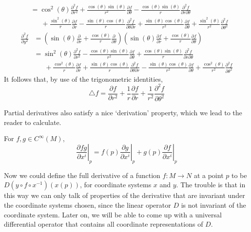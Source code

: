 \begin{example}
\begin{align*}
        &= \cos^2(\theta) \frac{\partial^2 f}{\partial r^2} + \frac{\cos(\theta) \sin(\theta)}{r^2} \frac{\partial f}{\partial \theta} - \frac{\cos(\theta) \sin(\theta)}{r} \frac{\partial^2 f}{\partial r \partial \theta}\\
        &\ \ \ \ \ \ \ + \frac{\sin^2(\theta)}{r} \frac{\partial f}{\partial r} - \frac{\sin(\theta) \cos(\theta)}{r} \frac{\partial^2 f}{\partial \theta \partial r} + \frac{\sin(\theta) \cos(\theta)}{r^2} \frac{\partial f}{\partial \theta} + \frac{\sin^2(\theta)}{r^2} \frac{\partial^2 f}{\partial \theta^2}
    \end{align*}
    \begin{align*}
        \frac{\partial^2 f}{\partial y^2} &= \left( \sin(\theta) \frac{\partial}{\partial r} + \frac{\cos(\theta)}{r} \frac{\partial}{\partial \theta} \right) \left( \sin(\theta) \frac{\partial f}{\partial r} + \frac{\cos(\theta)}{r} \frac{\partial f}{\partial \theta} \right)\\
        &= \sin^2(\theta) \frac{\partial^2 f}{\partial r^2} - \frac{\cos(\theta) \sin(\theta)}{r^2} \frac{\partial f}{\partial \theta} + \frac{\cos(\theta) \sin(\theta)}{r} \frac{\partial^2 f}{\partial r \partial \theta}\\
        &\ \ \ \ \ \ \ + \frac{\cos^2(\theta)}{r} \frac{\partial f}{\partial r} + \frac{\sin(\theta) \cos(\theta)}{r} \frac{\partial^2 f}{\partial \theta \partial r} - \frac{\sin(\theta) \cos(\theta)}{r^2} \frac{\partial f}{\partial \theta} + \frac{\cos^2(\theta)}{r^2} \frac{\partial^2 f}{\partial \theta^2}
    \end{align*}
    It follows that, by use of the trigonometric identities,
    \[ \bigtriangleup f = \frac{\partial f}{\partial r^2} + \frac{1}{r} \frac{\partial f}{\partial r} + \frac{1}{r^2} \frac{\partial^2 f}{\partial \theta^2} \]
\end{example}

Partial derivatives also satisfy a nice `derivation' property, which we lead to the reader to calculate.

\begin{lemma}
    For $f,g \in C^\infty(M)$,
    \[ \left.\frac{\partial fg}{\partial x^i}\right|_p = f(p)\left.\frac{\partial g}{\partial x^i}\right|_p + g(p)\left.\frac{\partial f}{\partial x^i}\right|_p  \]
\end{lemma}

Now we could define the full derivative of a function $f:M \to N$ at a point $p$ to be $D(y \circ f \circ x^{-1})(x(p))$, for coordinate systems $x$ and $y$. The trouble is that in this way we can only talk of properties of the derivative that are invariant under the coordinate systems chosen, since the linear operator $D$ is not invariant of the coordinate system. Later on, we will be able to come up with a universal differential operator that contains all coordinate representations of $D$.

